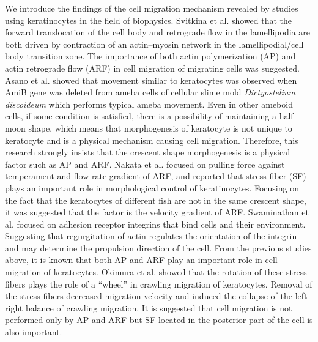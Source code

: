 \documentclass[a4paper,12pt]{book}
\begin{document}
We introduce the findings of the cell migration mechanism revealed by studies using keratinocytes in the field of biophysics.
Svitkina et al.\cite{svitkina1997analysis} showed that the forward translocation of the cell body and retrograde flow in the lamellipodia are both driven by contraction of an actin–myosin network in the lamellipodial/cell body transition zone.
The importance of both actin polymerization (AP) and actin retrograde flow (ARF) in cell migration of migrating cells was suggested.
Asano et al.\cite{asano2004keratocyte} showed that movement similar to keratocytes was observed when AmiB gene was deleted from ameba cells of cellular slime mold {\it Dictyostelium discoideum} which performs typical ameba movement.
Even in other ameboid cells, if some condition is satisfied, there is a possibility of maintaining a half-moon shape, which means that morphogenesis of keratocyte is not unique to keratocyte and is a physical mechanism causing cell migration.
Therefore, this research strongly insists that the crescent shape morphogenesis is a physical factor such as AP and ARF.
Nakata et al.\cite{nakata2016role} focused on pulling force against temperament and flow rate gradient of ARF, and reported that stress fiber (SF) plays an important role in morphological control of keratinocytes.
Focusing on the fact that the keratocytes of different fish are not in the same crescent shape, it was suggested that the factor is the velocity gradient of ARF.
Swaminathan et al.\cite{swaminathan2017actin} focused on adhesion receptor integrins that bind cells and their environment.
Suggesting that regurgitation of actin regulates the orientation of the integrin and may determine the propulsion direction of the cell. From the previous studies above, it is known that both AP and ARF play an important role in cell migration of keratocytes.
Okimura et al.\cite{okimura2018rotation} showed that the rotation of these stress fibers plays the role of a “wheel” in crawling migration of keratocytes.
Removal of the stress fibers decreased migration velocity and induced the collapse of the left-right balance of crawling migration.
It is suggested that cell migration is not performed only by AP and ARF but SF located in the posterior part of the cell is also important.
\end{document}
